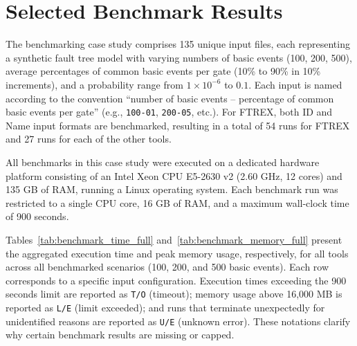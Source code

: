 \section{Selected Benchmark Results}
\label{sec:selected-benchmark-results}

% 

The benchmarking case study comprises 135 unique input files, each representing a synthetic fault tree model with varying numbers of basic events (100, 200, 500), average percentages of common basic events per gate (10\% to 90\% in 10\% increments), and a probability range from $1 \times 10^{-6}$ to $0.1$. Each input is named according to the convention ``number of basic events -- percentage of common basic events per gate'' (e.g., \texttt{100-01}, \texttt{200-05}, etc.). For FTREX, both ID and Name input formats are benchmarked, resulting in a total of 54 runs for FTREX and 27 runs for each of the other tools.



All benchmarks in this case study were executed on a dedicated hardware platform consisting of an Intel Xeon CPU E5-2630 v2 (2.60 GHz, 12 cores) and 135 GB of RAM, running a Linux operating system. Each benchmark run was restricted to a single CPU core, 16 GB of RAM, and a maximum wall-clock time of 900 seconds.

Tables~\ref{tab:benchmark_time_full} and~\ref{tab:benchmark_memory_full} present the aggregated execution time and peak memory usage, respectively, for all tools across all benchmarked scenarios (100, 200, and 500 basic events). Each row corresponds to a specific input configuration. Execution times exceeding the 900 seconds limit are reported as \texttt{T/O} (timeout); memory usage above 16,000 MB is reported as \texttt{L/E} (limit exceeded); and runs that terminate unexpectedly for unidentified reasons are reported as \texttt{U/E} (unknown error). These notations clarify why certain benchmark results are missing or capped.



